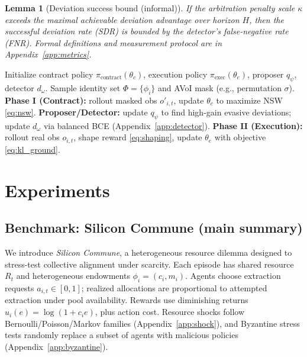 \documentclass{article}
\theoremstyle{definition}
\theoremstyle{plain}
\newtheorem{lemma}{Lemma}
\theoremstyle{remark}
\begin{document}
\begin{lemma}[Deviation success bound (informal)]
\label{lem:sdrbound_main}
If the arbitration penalty scale $\kappa$ exceeds the maximal achievable deviation advantage over horizon $H$, then the \emph{successful deviation rate} (SDR) is bounded by the detector's false-negative rate (FNR). Formal definitions and measurement protocol are in Appendix~\ref{app:metrics}.
\end{lemma}

\begin{algorithm}[t]
\caption{CSC (AVoI Contract + Grounding + Arbitration)}
\label{alg:csc}
\begin{algorithmic}[1]
\STATE Initialize contract policy $\pi_{\text{contract}}(\theta_c)$, execution policy $\pi_{\text{exec}}(\theta_e)$, proposer $q_\psi$, detector $d_\omega$.
  \STATE Sample identity set $\Phi=\{\phi_i\}$ and AVoI mask (e.g., permutation $\sigma$).
  \STATE \textbf{Phase I (Contract):} rollout masked obs $o'_{i,t}$, update $\theta_c$ to maximize NSW \eqref{eq:nsw}.
  \STATE \textbf{Proposer/Detector:} update $q_\psi$ to find high-gain evasive deviations; update $d_\omega$ via balanced BCE (Appendix~\ref{app:detector}).
  \STATE \textbf{Phase II (Execution):} rollout real obs $o_{i,t}$, shape reward \eqref{eq:shaping}, update $\theta_e$ with objective \eqref{eq:kl_ground}.
\ENDFOR
\end{algorithmic}
\end{algorithm}

\section{Experiments}
\label{sec:experiments}

\subsection{Benchmark: Silicon Commune (main summary)}
\label{sec:env_main}

We introduce \textit{Silicon Commune}, a heterogeneous resource dilemma designed to stress-test collective alignment under scarcity.
Each episode has shared resource $R_t$ and heterogeneous endowments $\phi_i=(c_i,m_i)$.
Agents choose extraction requests $a_{i,t}\in[0,1]$; realized allocations are proportional to attempted extraction under pool availability.
Rewards use diminishing returns $u_i(e)=\log(1+c_i e)$, plus action cost.
Resource shocks follow Bernoulli/Poisson/Markov families (Appendix~\ref{app:shock}), and Byzantine stress tests randomly replace a subset of agents with malicious policies (Appendix~\ref{app:byzantine}).
\end{document}
